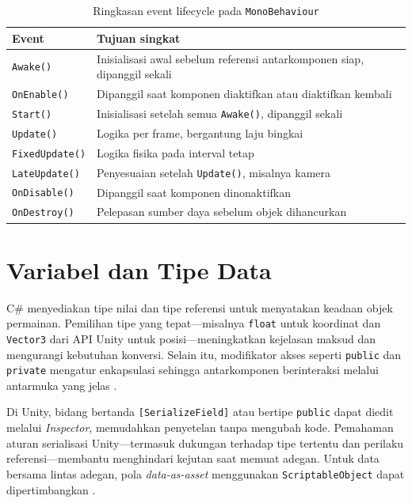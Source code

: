 \documentclass[../main.tex]{subfiles}
\begin{document}
\begin{table}[h]
  \centering
  \caption{Ringkasan event lifecycle pada \texttt{MonoBehaviour} \parencite{unity-execution-order}}
  \begin{tabularx}{\textwidth}{@{}lX@{}}
    \toprule
    Event & Tujuan singkat \\
    \midrule
    \texttt{Awake()} & Inisialisasi awal sebelum referensi antarkomponen siap, dipanggil sekali \\
    \texttt{OnEnable()} & Dipanggil saat komponen diaktifkan atau diaktifkan kembali \\
    \texttt{Start()} & Inisialisasi setelah semua \texttt{Awake()}, dipanggil sekali \\
    \texttt{Update()} & Logika per frame, bergantung laju bingkai \\
    \texttt{FixedUpdate()} & Logika fisika pada interval tetap \\
    \texttt{LateUpdate()} & Penyesuaian setelah \texttt{Update()}, misalnya kamera \\
    \texttt{OnDisable()} & Dipanggil saat komponen dinonaktifkan \\
    \texttt{OnDestroy()} & Pelepasan sumber daya sebelum objek dihancurkan \\
    \bottomrule
  \end{tabularx}
\end{table}

\section{Variabel dan Tipe Data}
C\# menyediakan tipe nilai dan tipe referensi untuk menyatakan keadaan objek permainan. Pemilihan tipe yang tepat—misalnya \texttt{float} untuk koordinat dan \texttt{Vector3} dari API Unity untuk posisi—meningkatkan kejelasan maksud dan mengurangi kebutuhan konversi. Selain itu, modifikator akses seperti \texttt{public} dan \texttt{private} mengatur enkapsulasi sehingga antarkomponen berinteraksi melalui antarmuka yang jelas \parencite{mslearn-csharp-guide,mslearn-csharp-types}.

Di Unity, bidang bertanda \texttt{[SerializeField]} atau bertipe \texttt{public} dapat diedit melalui \textit{Inspector}, memudahkan penyetelan tanpa mengubah kode. Pemahaman aturan serialisasi Unity—termasuk dukungan terhadap tipe tertentu dan perilaku referensi—membantu menghindari kejutan saat memuat adegan. Untuk data bersama lintas adegan, pola \textit{data-as-asset} menggunakan \texttt{ScriptableObject} dapat dipertimbangkan \parencite{unity-serialization,unity-scriptableobject}.

\onlyinsubfile{\printbibliography}
\end{document}
